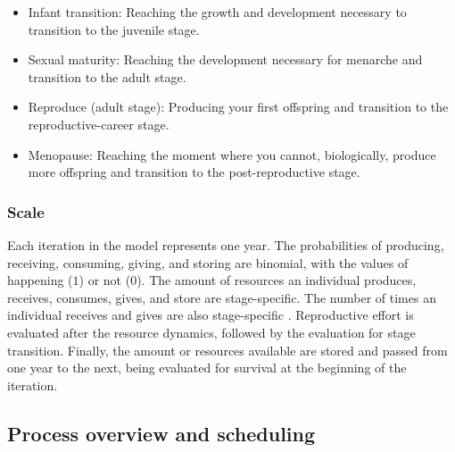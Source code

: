 \documentclass{article}
\begin{document}
\begin{itemize}
    \begin{itemize}
        \item Infant transition: Reaching the growth and development necessary to transition to the juvenile stage.
        \item Sexual maturity: Reaching the development necessary for menarche and transition to the adult stage.
        \item Reproduce (adult stage): Producing your first offspring and transition to the reproductive-career stage.
        \item Menopause: Reaching the moment where you cannot, biologically, produce more offspring and transition to the post-reproductive stage.
    \end{itemize}
\end{itemize}

\subsubsection{Scale}

Each iteration in the model represents one year. The probabilities  of producing, receiving, consuming, giving, and storing are binomial, with the values of happening ($1$) or not ($0$). The amount of resources an individual produces, receives, consumes, gives, and store are stage-specific. The number of times an individual receives and gives are also stage-specific . Reproductive effort is evaluated after the resource dynamics, followed by the evaluation for stage transition. Finally, the amount or resources available are stored and passed from one year to the next, being evaluated for survival at the beginning of the iteration.

\subsection{Process overview and scheduling}
\end{document}
